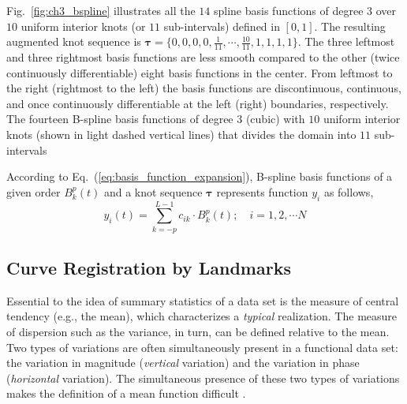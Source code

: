 Fig.~\ref{fig:ch3_bspline} illustrates all the $14$ spline basis functions of degree $3$ over $10$ uniform interior knots (or $11$ sub-intervals) defined in $[0,1]$.
The resulting augmented knot sequence is $\boldsymbol{\tau}=\{0, 0, 0, 0, \frac{1}{11}, \cdots, \frac{10}{11}, 1, 1, 1, 1\}$.
The three leftmost and three rightmost basis functions are less smooth compared to the other (twice continuously differentiable) eight basis functions in the center. 
From leftmost to the right (rightmost to the left) the basis functions are discontinuous, continuous, and once continuously differentiable at the left (right) boundaries, respectively.
{The fourteen B-spline basis functions of degree $3$ (cubic) with $10$ uniform interior knots (shown in light dashed vertical lines) that divides the domain into $11$ sub-intervals}

According to Eq.~(\ref{eq:basis_function_expansion}), B-spline basis functions of a given order $B_k^p (t)$ and a knot sequence $\boldsymbol{\tau}$ 
represents function $y_i$ as follows,
\begin{equation}
	y_i (t) = \sum_{k = -p}^{L-1} c_{ik} \cdot B^p_k (t); \quad i = 1, 2, \cdots N
\label{eq:basis_function_expansion}
\end{equation}

\subsection{Curve Registration by Landmarks}\label{sub:sa_registration}

Essential to the idea of summary statistics of a data set is the measure of central tendency (e.g., the mean),
which characterizes a \emph{typical} realization.
The measure of dispersion such as the variance, in turn, can be defined relative to the mean. 
Two types of variations are often simultaneously present in a functional data set: 
the variation in magnitude (\emph{vertical} variation) and the variation in phase (\emph{horizontal} variation).
The simultaneous presence of these two types of variations makes the definition of a mean function difficult \cite{Kneip1992}.

